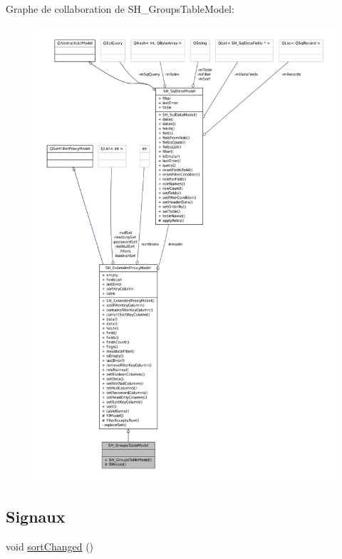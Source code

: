 Graphe de collaboration de S\-H\-\_\-\-Groups\-Table\-Model\-:
\nopagebreak
\begin{figure}[H]
\begin{center}
\leavevmode
\includegraphics[width=350pt]{classSH__GroupsTableModel__coll__graph}
\end{center}
\end{figure}
\subsection*{Signaux}
\begin{DoxyCompactItemize}
\item 
void \hyperlink{classSH__ExtendedProxyModel_a573590c2763d06d07c6509d4c91a06b2}{sort\-Changed} ()
\end{DoxyCompactItemize}
